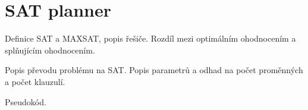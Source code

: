 \section{SAT planner}\label{sec:sat-planner}

Definice SAT a MAXSAT, popis řešiče.
Rozdíl mezi optimálním ohodnocením a splňujícím ohodnocením.

Popis převodu problému na SAT.
Popis parametrů a odhad na počet proměnných a počet klauzulí.

Pseudokód.
